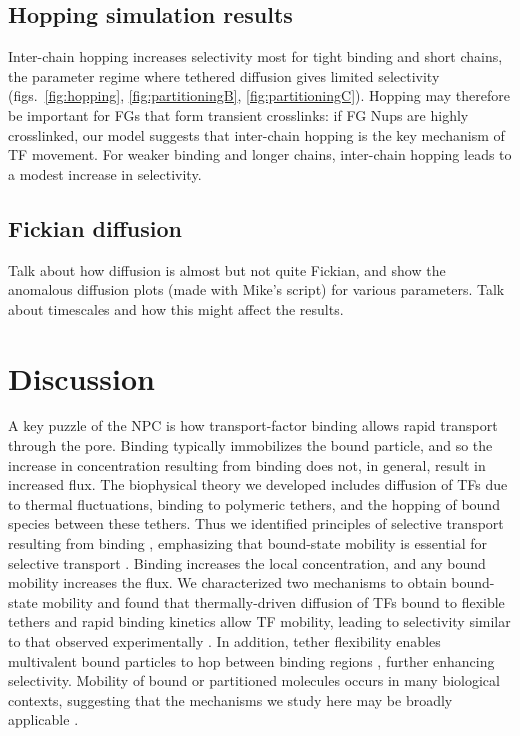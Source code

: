\subsection{Hopping simulation results}
Inter-chain hopping increases selectivity most for tight binding and short chains, the parameter regime where tethered diffusion gives limited selectivity (figs.~\ref{fig:hopping}, \ref{fig:partitioningB}, \ref{fig:partitioningC}). Hopping may therefore be important for FGs that form transient crosslinks: if FG Nups are highly crosslinked, our model suggests that inter-chain hopping is the key mechanism of TF movement.  For weaker binding and longer chains, inter-chain hopping leads to a modest increase in selectivity.

\subsection{Fickian diffusion}
Talk about how diffusion is almost but not quite Fickian, and show the anomalous diffusion plots (made with Mike's script) for various parameters. Talk about timescales and how this might affect the results.

\section{Discussion}
A key puzzle of the NPC is how transport-factor binding allows rapid transport through the pore.  Binding typically immobilizes the bound particle, and so the increase in concentration resulting from binding does not, in general, result in increased flux. The biophysical theory
we developed includes diffusion of TFs due to thermal fluctuations,
binding to polymeric tethers, and the hopping of bound species between
these tethers.  Thus we identified principles of selective transport
resulting from binding , emphasizing that
bound-state mobility is essential for selective transport
.  Binding increases the local concentration,
and any bound mobility increases the flux.  We characterized two
mechanisms to obtain bound-state mobility and found that
thermally-driven diffusion of TFs bound to flexible tethers and rapid
binding kinetics \cite{hough15, milles15} allow TF mobility, leading
to selectivity similar to that observed experimentally
.  In addition, tether flexibility enables
multivalent bound particles to hop between binding regions
 \cite{lowe15, schoch12}, further enhancing
selectivity. Mobility of bound or partitioned molecules occurs in many
biological contexts, suggesting that the mechanisms we study here may
be broadly applicable \cite{stefferson17, braga07}.


